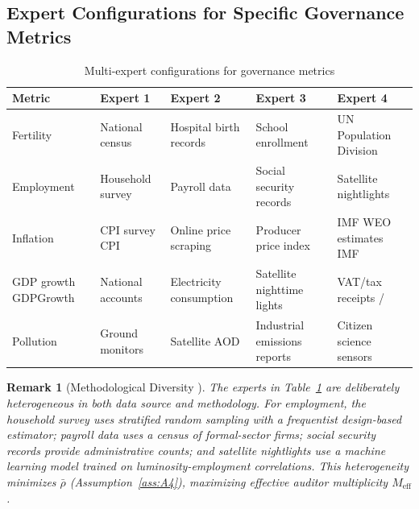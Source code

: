 \documentclass[11pt,a4paper]{article}
\newtheorem{remark}[theorem]{Remark}
\theoremstyle{definition}
\begin{document}
\subsection{Expert Configurations for Specific Governance Metrics}
\begin{table}[htbp]
\centering
\caption{Multi-expert configurations for governance metrics}
\label{tab:expert_configs}
\begin{tabular}{lp{2.5cm}p{3cm}p{3cm}p{2.5cm}}
\toprule
\textbf{Metric} & \textbf{Expert 1} & \textbf{Expert 2} & \textbf{Expert 3} & \textbf{Expert 4} \\
\midrule
Fertility  & National census  & Hospital birth records  & School enrollment  & UN Population Division  \\
\midrule
Employment  & Household survey  & Payroll data  & Social security records  & Satellite nightlights  \\
\midrule
Inflation  & CPI survey CPI & Online price scraping  & Producer price index  & IMF WEO estimates IMF \\
\midrule
GDP growth GDPGrowth & National accounts  & Electricity consumption  & Satellite nighttime lights  & VAT/tax receipts / \\
\midrule
Pollution  & Ground monitors  & Satellite AOD  & Industrial emissions reports  & Citizen science sensors  \\
\bottomrule
\end{tabular}
\end{table}
\begin{remark}[Methodological Diversity ]
\label{rem:method_diversity}
The experts in Table~\ref{tab:expert_configs} are deliberately heterogeneous in both data source and methodology. For employment, the household survey uses stratified random sampling with a frequentist design-based estimator; payroll data uses a census of formal-sector firms; social security records provide administrative counts; and satellite nightlights use a machine learning model trained on luminosity-employment correlations. This heterogeneity minimizes $\bar{\rho}$ (Assumption~\ref{ass:A4}), maximizing effective auditor multiplicity $M_{\mathrm{eff}}$.
\end{remark}
\end{document}
